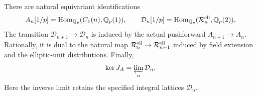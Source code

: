 \begin{theorem}\label{thm:cm-elliptic-euler-kernel}
There are natural equivariant identifications
\[
 A_n[1/p]=\operatorname{Hom}_{\mathbb Q_p}
                         (C_1(n),\mathbb Q_p(1)),
 \qquad
 \mathcal D_n[1/p]=\operatorname{Hom}_{\mathbb Q_p}
                         (\mathcal R_n^{\rm ell},\mathbb Q_p(2)).
\]
The transition \(\mathcal D_{n+1}\to\mathcal D_n\)
is induced by the actual pushforward
\(A_{n+1}\to A_n\).  Rationally, it is dual to the
natural map \(\mathcal R_n^{\rm ell}\to
\mathcal R_{n+1}^{\rm ell}\) induced by field extension
and the elliptic-unit distributions.  Finally,
\begin{equation}\label{eq:cm-J-kernel-elliptic-limit}
                       \ker J_A=\varprojlim_n\mathcal D_n.
\end{equation}
Here the inverse limit retains the specified integral
lattices \(\mathcal D_n\).
\end{theorem}

